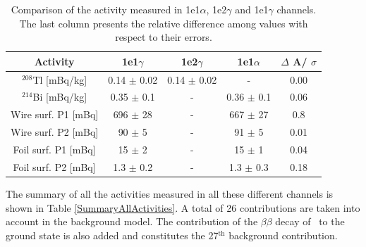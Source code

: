\documentclass[main.tex]{subfiles}
\begin{document}
\begin{table}[h!]
\centering
\begin{tabular}{c|c|c|c|c}
Activity & 1e1$\gamma$ & 1e2$\gamma$ & 1e1$\alpha$ & $\Delta$ A/ $\sigma$ \\[0.1cm]
\toprule
$^{\text{208}}$Tl [mBq/kg] & 0.14 $\pm$ 0.02 & 0.14 $\pm$ 0.02 & - & 0.00 \\[0.1cm]
$^{\text{214}}$Bi [mBq/kg] & 0.35 $\pm$ 0.1  & -               & 0.36 $\pm$ 0.1 & 0.06 \\[0.1cm]
Wire surf. P1 [mBq]        & 696  $\pm$ 28   & -               & 667  $\pm$ 27  & 0.8  \\[0.1cm]
Wire surf. P2 [mBq]        & 90   $\pm$ 5    & -               & 91   $\pm$ 5   & 0.01 \\[0.1cm]
Foil surf. P1 [mBq]        & 15   $\pm$ 2    & -               & 15   $\pm$ 1   & 0.04 \\[0.1cm]
Foil surf. P2 [mBq]        & 1.3  $\pm$ 0.2  & -               & 1.3  $\pm$ 0.3 & 0.18 \\[0.1cm]
\bottomrule
\end{tabular}
\caption{Comparison of the activity measured in 1e1$\alpha$, 1e2$\gamma$ and 1e1$\gamma$ channels. The last column presents the relative difference among values with respect to their errors.}
\label{Table:BkgValidation}
\end{table}





\NI The summary of all the activities measured in all these different channels is shown in Table \ref{SummaryAllActivities}. A total of 26 contributions are taken into account in the background model. The contribution of the $\beta \beta$ decay of \Cd~to the ground state is also added and constitutes the 27$^{\text{th}}$ background contribution.
\end{document}
